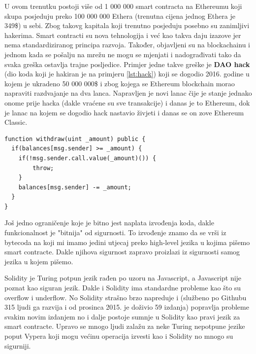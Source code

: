 \documentclass[12pt]{report}
\begin{document}
U ovom trenutku postoji više od 1 000 000 smart contracta na Ethereumu koji skupa posjeduju preko 100 000 000 Ethera (trenutna cijena jednog Ethera je 349\$) u sebi. Zbog takovg kapitala koji trenutno posjeduju posebno su zanimljivi hakerima. Smart contracti su nova tehnologija i već kao takva daju izazove jer nema standardiziranog principa razvoja. Također, objavljeni su na blockachainu i jednom kada se pošalju na mrežu ne mogu se mjenjati i nadograđivati tako da svaka greška ostavlja trajne posljedice. Primjer jedne takve greške je \textbf{DAO hack} (dio koda koji je hakiran je na primjeru \ref{lst:hack}) koji se dogodio 2016. godine u kojem je ukradeno 50 000 000\$ i zbog kojega se Ethereum blockchain morao napraviti razdvajanje na dva lanca. Napravljen je novi lanac čije je stanje jednako onome prije hacka (dakle vraćene su sve transakcije) i danas je to Ethereum, dok je lanac na kojem se dogodio hack nastavio živjeti i danas se on zove Ethereum Classic.

\begin{minipage}{\linewidth}
\begin{lstlisting}[caption = Ukratko: DAO je jedna od drugih valuta na Ethereumu koja je imala svoju protuvrijednost u Etheru. Funkcija witdraw jednostavno povlači sredstva koje account ima na smart contractu. No što ako damo hrpu zahtjeva odjednom? Tada se sredstva konstantno prebacuju na account no na smart contractu se ne stigne smanjiti, language=solidity, label={lst:hack}]
function withdraw(uint _amount) public {
  if(balances[msg.sender] >= _amount) {
    if(!msg.sender.call.value(_amount)()) { 
        throw;
    }
    balances[msg.sender] -= _amount;
  }
}
\end{lstlisting}
\end{minipage}

Još jedno ograničenje koje je bitno jest naplata izvođenja koda, dakle funkcionalnost je "bitnija" od sigurnosti. To izvođenje znamo da se vrši iz bytecoda na koji mi imamo jedini utjecaj preko high-level jezika u kojima pišemo smart contracte. Dakle njihova sigurnost zapravo proizlazi iz sigurnosti samog jezika u kojem pišemo.

Solidity je Turing potpun jezik rađen po uzoru na Javascript, a Javascript nije poznat kao siguran jezik. Dakle i Solidity ima standardne probleme kao što su overflow i underflow. No Solidity strašno brzo napreduje i (službeno po Githubu 315 ljudi ga razvija i od prosinca 2015. je doživio 59 izdanja) popravlja probleme svakim novim izdanjem no i dalje postoje sumnje u Solidity kao pravi jezik za smart contracte. Upravo se mnogo ljudi zalažu za neke Turing nepotpune jezike poput Vypera koji mogu većinu operacija izvesti kao i Solidity no mnogo su sigurniji.
\end{document}
